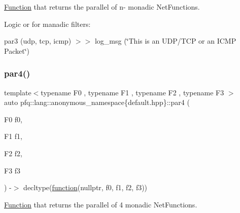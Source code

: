 \hyperlink{structpfq_1_1lang_1_1Function}{Function} that returns the parallel of n-\/ monadic Net\+Functions. 

Logic \textquotesingle{}or\textquotesingle{} for manadic filters\+:

par3 (udp, tcp, icmp) $>$$>$ log\+\_\+msg (\char`\"{}\+This is an U\+D\+P/\+T\+C\+P or an I\+C\+M\+P Packet\char`\"{}) \mbox{\label{namespacepfq_1_1lang_1_1anonymous__namespace_02default_8hpp_03_ade490883fcf82e5cf579274e3ee6520d}} 
\subsubsection{\texorpdfstring{par4()}{par4()}}
{\footnotesize\ttfamily template$<$typename F0 , typename F1 , typename F2 , typename F3 $>$ \\
auto pfq\+::lang\+::anonymous\+\_\+namespace\{default.\+hpp\}\+::par4 (\begin{DoxyParamCaption}\item[{F0}]{f0,  }\item[{F1}]{f1,  }\item[{F2}]{f2,  }\item[{F3}]{f3 }\end{DoxyParamCaption}) -\/$>$ decltype(\hyperlink{namespacepfq_1_1lang_a1a4638059d700ae08d0ca63886ff2bb3}{function}(nullptr, f0, f1, f2, f3))
        }



\hyperlink{structpfq_1_1lang_1_1Function}{Function} that returns the parallel of 4 monadic Net\+Functions. 

\mbox{\label{namespacepfq_1_1lang_1_1anonymous__namespace_02default_8hpp_03_a495f1dc7f1b0fbe9f822bf5f484cf2ab}} 
